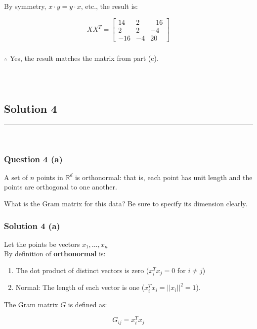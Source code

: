 \documentclass{article}
\begin{document}
By symmetry, $x \cdot y = y \cdot x$, etc., the result is:

$$ XX^T = \begin{bmatrix} 14 & 2 & -16 \\ 2 & 2 & -4 \\ -16 & -4 & 20 \end{bmatrix} $$

\subsubsection*{\normalfont}{$\therefore$ Yes, the result matches the matrix from part (c).}

\noindent\rule{\textwidth}{0.4pt}\\

\newpage

\subsection*{Solution 4}
\noindent\rule{\textwidth}{0.4pt}\\
\subsubsection*{Question 4 (a)}
\begin{flushleft}
    A set of $n$ points in $\mathbb{R}^d$ is orthonormal: that is, each point has unit length and the points are orthogonal to one another.

\end{flushleft}
\begin{flushleft}
    What is the Gram matrix for this data? Be sure to specify its dimension clearly.
    
\end{flushleft}

\subsubsection*{Solution 4 (a)}
Let the points be vectors $x_1, \ldots, x_n$ \\
By definition of \textbf{orthonormal} is:
\begin{enumerate}
    \item The dot product of distinct vectors is zero ($x_i^T x_j = 0$ for $i \neq j$)
    \item Normal: The length of each vector is one ($x_i^T x_i = ||x_i||^2 = 1$).
\end{enumerate}
\begin{flushleft}
    The Gram matrix $G$ is defined as: 
\end{flushleft}
$$G_{ij} = x_i^T x_j$$
\end{document}
